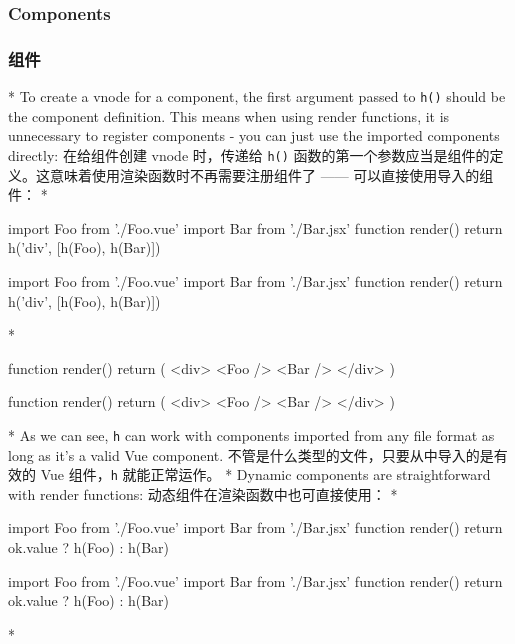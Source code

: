 \begin{paracol}{2}
\subsubsection{Components}
\switchcolumn
\subsubsection{组件}
\switchcolumn[0]*%
To create a vnode for a component, the first argument passed to
\texttt{h()} should be the component definition. This means when using
render functions, it is unnecessary to register components - you can
just use the imported components directly:
\switchcolumn
在给组件创建 vnode 时，传递给 \texttt{h()}
函数的第一个参数应当是组件的定义。这意味着使用渲染函数时不再需要注册组件了
------ 可以直接使用导入的组件：
\switchcolumn[0]*%
\begin{codeJs}
import Foo from './Foo.vue'
import Bar from './Bar.jsx'
function render() {
  return h('div', [h(Foo), h(Bar)])
}
\end{codeJs}
\switchcolumn
\begin{codeJs}
import Foo from './Foo.vue'
import Bar from './Bar.jsx'
function render() {
  return h('div', [h(Foo), h(Bar)])
}
\end{codeJs}
\switchcolumn[0]*%
\begin{codeHtml}
function render() {
  return (
    <div>
      <Foo />
      <Bar />
    </div>
  )
}
\end{codeHtml}
\switchcolumn
\begin{codeHtml}
function render() {
  return (
    <div>
      <Foo />
      <Bar />
    </div>
  )
}
\end{codeHtml}
\switchcolumn[0]*%
As we can see, \texttt{h} can work with components imported from any
file format as long as it's a valid Vue component.
\switchcolumn
不管是什么类型的文件，只要从中导入的是有效的 Vue 组件，\texttt{h}
就能正常运作。
\switchcolumn[0]*%
Dynamic components are straightforward with render functions:
\switchcolumn
动态组件在渲染函数中也可直接使用：
\switchcolumn[0]*%
\begin{codeJs}
import Foo from './Foo.vue'
import Bar from './Bar.jsx'
function render() {
    return ok.value ? h(Foo) : h(Bar)
}
\end{codeJs}
\switchcolumn
\begin{codeJs}
import Foo from './Foo.vue'
import Bar from './Bar.jsx'
function render() {
    return ok.value ? h(Foo) : h(Bar)
}
\end{codeJs}
\switchcolumn[0]*%

\end{paracol}
